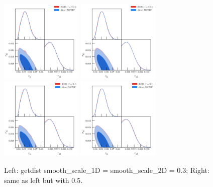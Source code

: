 \documentclass[prd,amsmath,amssymb,floatfix,superscriptaddress,nofootinbib]{revtex4-1}
\begin{document}
\begin{figure}
%
\includegraphics[width=0.35\textwidth]{results/cosmomc_kde/pl18_tanh_highz_test5_run1_vs_relike_tanh_highz_test8_run9_f0p14_taulo_prior_0p03_zre_prior_6p1_taulo_prior_0p0_tri_smooth_scale_1D_0.3_num_bins_1D_100_smooth_scale_2D_0.3_num_bins_2D_100.png}
\includegraphics[width=0.35\textwidth]{results/cosmomc_kde/pl18_tanh_highz_test5_run1_vs_relike_tanh_highz_test8_run9_f0p14_taulo_prior_0p03_zre_prior_6p1_taulo_prior_0p0_tri_smooth_scale_1D_0.5_num_bins_1D_100_smooth_scale_2D_0.5_num_bins_2D_100.png}
%
\includegraphics[width=0.35\textwidth]{results/cosmomc_kde/pl18_tanh_highz_test5_run1_vs_relike_tanh_highz_test9_run3_f0p10_taulo_prior_0p03_zre_prior_6p1_taulo_prior_0p0_tri_smooth_scale_1D_0.3_num_bins_1D_100_smooth_scale_2D_0.3_num_bins_2D_100.png}
\includegraphics[width=0.35\textwidth]{results/cosmomc_kde/pl18_tanh_highz_test5_run1_vs_relike_tanh_highz_test9_run3_f0p10_taulo_prior_0p03_zre_prior_6p1_taulo_prior_0p0_tri_smooth_scale_1D_0.5_num_bins_1D_100_smooth_scale_2D_0.5_num_bins_2D_100.png}
%
\label{fig:}
\caption{Left: getdist smooth\_scale\_1D = smooth\_scale\_2D = 0.3; Right: same as left but with 0.5.
} 
\end{figure}
\end{document}
